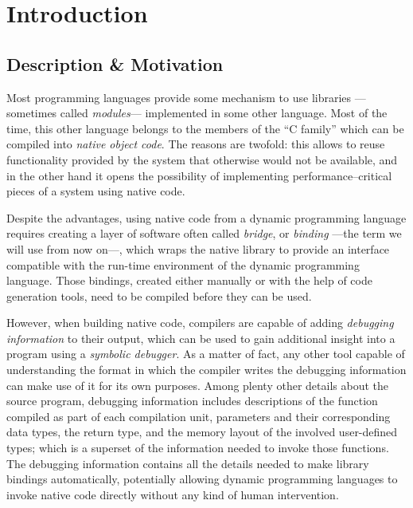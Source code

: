 
\chapter{Introduction}

\section{Description \& Motivation}

Most programming languages provide some mechanism to use libraries —sometimes
called \emph{modules}— implemented in some other language. Most of the time,
this other language belongs to the members of the “C family” which can be
compiled into \emph{native object code}. The reasons are twofold: this allows
to reuse functionality provided by the system that otherwise would not be
available, and in the other hand it opens the possibility of implementing
performance--critical pieces of a system using native code.

Despite the advantages, using native code from a dynamic programming language
requires creating a layer of software often called \emph{bridge}, or
\emph{binding} —the term we will use from now on—, which wraps the native
library to provide an interface compatible with the run-time environment
of the dynamic programming language. Those bindings, created either manually
or with the help of code generation tools, need to be compiled before they can
be used.

However, when building native code, compilers are capable of adding
\emph{debugging information} to their output, which can be used to gain
additional insight into a program using a \emph{symbolic debugger}. As
a matter of fact, any other tool capable of understanding the format in which
the compiler writes the debugging information can make use of it for its own
purposes. Among plenty other details about the source program, debugging
information includes descriptions of the function compiled as part of each
compilation unit, parameters and their corresponding data types, the return
type, and the memory layout of the involved user-defined types; which is a
superset of the information needed to invoke those functions. The debugging
information contains all the details needed to make library bindings
automatically, potentially allowing dynamic programming languages to invoke
native code directly without any kind of human intervention.



